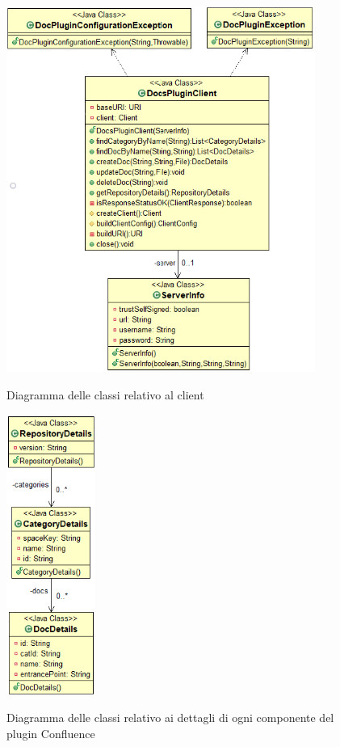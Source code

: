 \begin{figure}[H]
    \centering
    \includegraphics[width=0.9\textwidth]{immagini/client.png}\\
    \caption{Diagramma delle classi relativo al client}
\end{figure}

\begin{figure}[H]
    \centering
    \includegraphics[width=0.26\textwidth]{immagini/details.png}\\
    \caption{Diagramma delle classi relativo ai dettagli di ogni componente del plugin Confluence}
\end{figure}

